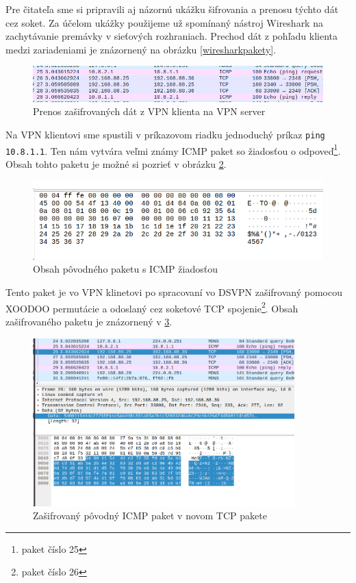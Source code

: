 Pre čitateľa sme si pripravili aj názornú ukážku šifrovania a prenosu týchto dát cez soket. Za účelom ukážky použijeme už spomínaný nástroj Wireshark na zachytávanie premávky v sieťových rozhraniach. Prechod dát z pohľadu klienta medzi zariadeniami je znázornený na obrázku \ref{wiresharkpakety}. 
\begin{figure}[h!]
	\centering
	\includegraphics[width=1\textwidth]{figures/wiresharkpakety}
	\caption{Prenos zašifrovaných dát z VPN klienta na VPN server}
	\label{:wiresharkpakety}
\end{figure}
Na VPN klientovi sme spustili v príkazovom riadku jednoduchý príkaz \lstinline|ping 10.8.1.1|. Ten nám vytvára veľmi známy ICMP paket so žiadosťou o odpoveď\footnote{paket číslo 25}. Obsah tohto paketu je možné si pozrieť v obrázku \ref{req}. %
\begin{figure}[h!]
	\centering
	\includegraphics[width=1\textwidth]{figures/req}
	\caption{Obsah pôvodného paketu s ICMP žiadosťou}
	\label{req}
\end{figure}
Tento paket je vo VPN klinetovi po spracovaní vo DSVPN zašifrovaný pomocou XOODOO permutácie a odoslaný cez soketové TCP spojenie\footnote{paket číslo 26}. Obsah zašifrovaného paketu je znázornený v \ref{sifrovanypaket}. 
\begin{figure}[h!]
	\centering
	\includegraphics[width=0.9\textwidth]{figures/sifrovanypaket}
	\caption{Zašifrovaný pôvodný ICMP paket v novom TCP pakete}
	\label{sifrovanypaket}
\end{figure}
